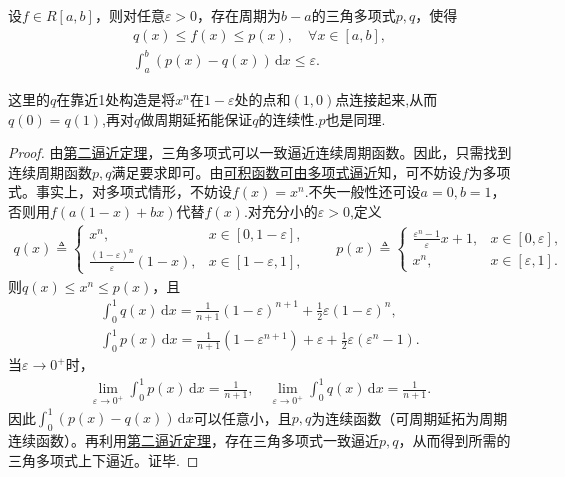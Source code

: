 \documentclass[../../main.tex]{subfiles}%
\begin{document}
\begin{corollary}\label{cor:周期上下逼近}
设$f\in R[a,b]$，则对任意$\varepsilon>0$，存在周期为$b-a$的三角多项式$p,q$，使得
\begin{gather}
q(x)\leqslant f(x)\leqslant p(x),\quad \forall x\in[a,b], \label{cor16:ineq}\\
\int_{a}^{b} (p(x)-q(x))\,\mathrm{d}x \leqslant \varepsilon. \label{cor16:int}
\end{gather}
\end{corollary}
\begin{remark}
这里的$q$在靠近1处构造是将$x^n$在$1-\varepsilon$处的点和$(1,0)$点连接起来,从而$q(0)=q(1)$,再对$q$做周期延拓能保证$q$的连续性.$p$也是同理.
\end{remark}
\begin{proof}

由\hyperref[theorem:第二逼近定理]{第二逼近定理}，三角多项式可以一致逼近连续周期函数。因此，只需找到连续周期函数$p,q$满足要求即可。由\hyperref[theorem:可积被连续函数逼近-2]{可积函数可由多项式逼近}知，可不妨设$f$为多项式。事实上，对多项式情形，不妨设$f(x)=x^n$.不失一般性还可设$a=0,b=1$，否则用$f(a(1-x)+bx)$代替$f(x)$.对充分小的$\varepsilon>0$,定义
\begin{align*}
q(x)\triangleq 
\begin{cases}
x^n, & x\in[0,1-\varepsilon],\\
\frac{(1-\varepsilon)^n}{\varepsilon}(1-x), & x\in[1-\varepsilon,1],
\end{cases}
\qquad
p(x)\triangleq 
\begin{cases}
\frac{\varepsilon^n-1}{\varepsilon}x+1, & x\in[0,\varepsilon],\\
x^n, & x\in[\varepsilon,1].
\end{cases}
\end{align*}
则$q(x)\leqslant x^n\leqslant p(x)$，且
\begin{gather*}
\int_{0}^{1} q(x)\,\mathrm{d}x = \frac{1}{n+1}(1-\varepsilon)^{n+1} + \frac{1}{2}\varepsilon(1-\varepsilon)^n, \\
\int_{0}^{1} p(x)\,\mathrm{d}x = \frac{1}{n+1}(1-\varepsilon^{n+1}) + \varepsilon + \frac{1}{2}\varepsilon(\varepsilon^n-1). 
\end{gather*}
当$\varepsilon\to0^+$时，
\begin{align}
\lim\limits_{\varepsilon\to0^+} \int_{0}^{1} p(x)\,\mathrm{d}x = \frac{1}{n+1}, \quad \lim\limits_{\varepsilon\to0^+} \int_{0}^{1} q(x)\,\mathrm{d}x = \frac{1}{n+1}. \label{cor16:lim}
\end{align}
因此$\int_{0}^{1} (p(x)-q(x))\,\mathrm{d}x$可以任意小，且$p,q$为连续函数（可周期延拓为周期连续函数）。再利用\hyperref[theorem:第二逼近定理]{第二逼近定理}，存在三角多项式一致逼近$p,q$，从而得到所需的三角多项式上下逼近。证毕.
\end{proof}
\end{document}

